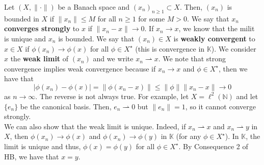 \documentclass[12pt]{article}
\def\K{\mathbb{K}}
\newcommand{\N}{{\mathbb N}}
\newcommand{\sbs}{\subset}
\newcommand{\Xs}{X^{\star}}
\newcommand{\ns}{(X, \| \cdot \|)}
\newcommand{\weak}{\rightharpoonup}
\begin{document}
\vspace{-25pt}
Let $\ns$ be a Banach space and $(x_n)_{n \geq 1} \sbs X$. Then, $(x_n)$ is bounded in $X$ if $\| x_n \| \leq M$ for all $n \geq 1$ for some $M >0$. We say that $x_n$ \textbf{converges strongly} to $x$ if $\| x_n - x \| \to 0$. If $x_n \to x$, we know that the milit is unique and $x_n$ is bounded. We say that $(x_n) \in X$ is \textbf{weakly convergent} to $x \in X$ if $\phi(x_n) \to \phi(x)$ for all $\phi \in \Xs$ (this is convergence in $\K$). We consider $x$ the \textbf{weak limit} of $(x_n)$ and we write $x_n \rightharpoonup x$. We note that strong convergence implies weak convergence because if $x_n \to x$ and $\phi \in \Xs$, then we have that 
\[|\phi(x_n) - \phi(x) | = \| \phi(x_n - x)\| \leq \| \phi\| \| x_n - x \| \to 0\]
as $n \to \infty$. The reverse is not always true. For example, let $X = \ell^2(\N)$ and let $\{ e_n \}$ be the canonical basis. Then, $e_n \rightharpoonup 0$ but $\| e_n \| = 1$, so it cannot converge strongly. \\
\indent We can also show that the weak limit is unique. Indeed, if $x_n \weak x$ and $x_n \weak y$ in $X$, then $\phi(x_n) \to \phi(x)$ and $\phi(x_n) \to \phi(y)$ in $\K$ (for any $\phi \in \Xs$). In $\K$, the limit is unique and thus, $\phi(x) = \phi(y)$ for all $\phi \in \Xs$. By Consequence 2 of HB, we have that $x = y$. 
\end{document}
